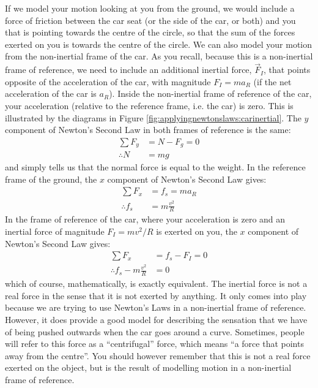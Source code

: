 If we model your motion looking at you from the ground, we would include a force of friction between the car seat (or the side of the car, or both) and you that is pointing towards the centre of the circle, so that the sum of the forces exerted on you is towards the centre of the circle. We can also model your motion from the non-inertial frame of the car. As you recall, because this is a non-inertial frame of reference, we need to include an additional inertial force, $\vec F_I$, that points opposite of the acceleration of the car, with magnitude $F_I=ma_R$ (if the net acceleration of the car is $a_R$). Inside the non-inertial frame of reference of the car, your acceleration (relative to the reference frame, i.e. the car) is zero. This is illustrated by the diagrams in Figure \ref{fig:applyingnewtonslaws:carinertial}.
The $y$ component of Newton's Second Law in both frames of reference is the same:
\begin{align*}
\sum F_y&=N-F_g=0\\
\therefore N&=mg
\end{align*}
and simply tells us that the normal force is equal to the weight. In the reference frame of the ground, the $x$ component of Newton's Second Law gives:
\begin{align*}
\sum F_x &= f_s = ma_R\\
\therefore f_s &= m\frac{v^2}{R}
\end{align*}
In the frame of reference of the car, where your acceleration is zero and an inertial force of magnitude $F_I=mv^2/R$ is exerted on you, the $x$ component of Newton's Second Law gives:
\begin{align*}
\sum F_x &= f_s-F_I = 0\\
\therefore f_s - m\frac{v^2}{R} &= 0
\end{align*}
which of course, mathematically, is exactly equivalent. The inertial force is not a real force in the sense that it is not exerted by anything. It only comes into play because we are trying to use Newton's Laws in a non-inertial frame of reference. However, it does provide a good model for describing the sensation that we have of being pushed outwards when the car goes around a curve. Sometimes, people will refer to this force as a ``centrifugal'' force, which means ``a force that points away from the centre''. You should however remember that this is not a real force exerted on the object, but is the result of modelling motion in a non-inertial frame of reference.

